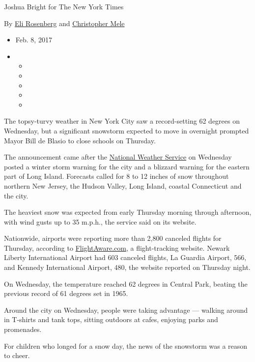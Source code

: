 Joshua Bright for The New York Times

By \href{https://www.nytimes.com/by/eli-rosenberg}{Eli Rosenberg} and
\href{https://www.nytimes.com/by/christopher-mele}{Christopher Mele}

\begin{itemize}
\item
  Feb. 8, 2017
\item
  \begin{itemize}
  \item
  \item
  \item
  \item
  \item
  \end{itemize}
\end{itemize}

The topsy-turvy weather in New York City saw a record-setting 62 degrees
on Wednesday, but a significant snowstorm expected to move in overnight
prompted Mayor Bill de Blasio to close schools on Thursday.

The announcement came after the
\href{http://www.weather.gov/media/okx/Briefings/CoastalStormBriefing.pdf}{National
Weather Service} on Wednesday posted a winter storm warning for the city
and a blizzard warning for the eastern part of Long Island. Forecasts
called for 8 to 12 inches of snow throughout northern New Jersey, the
Hudson Valley, Long Island, coastal Connecticut and the city.

The heaviest snow was expected from early Thursday morning through
afternoon, with wind gusts up to 35 m.p.h., the service said on its
website.

Nationwide, airports were reporting more than 2,800 canceled flights for
Thursday, according to
\href{http://flightaware.com/live/cancelled/tomorrow/}{FlightAware.com},
a flight-tracking website. Newark Liberty International Airport had 603
canceled flights, La Guardia Airport, 566, and Kennedy International
Airport, 480, the website reported on Thursday night.

On Wednesday, the temperature reached 62 degrees in Central Park,
beating the previous record of 61 degrees set in 1965.

Around the city on Wednesday, people were taking advantage --- walking
around in T-shirts and tank tops, sitting outdoors at cafes, enjoying
parks and promenades.

For children who longed for a snow day, the news of the snowstorm was a
reason to cheer.


